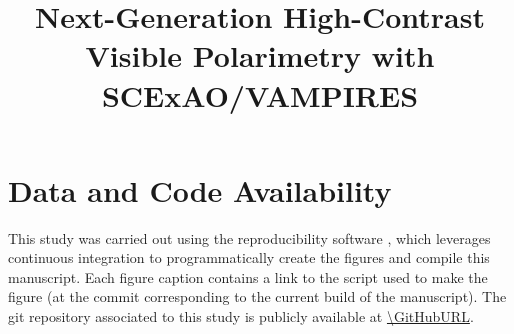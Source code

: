 \documentclass[twocolumn]{aastex631}
\begin{document}
\title{Next-Generation High-Contrast Visible Polarimetry with SCExAO/VAMPIRES}

\begin{abstract}
    
\end{abstract}














\software{}



\appendix



\section{Data and Code Availability}
This study was carried out using the reproducibility software \href{https://github.com/showyourwork/showyourwork}{\showyourwork} \citep{luger_mapping_2021}, which leverages continuous integration to programmatically create the figures and compile this manuscript. Each figure caption contains a link to the script used to make the figure (at the commit corresponding to the current build of the manuscript). The git repository associated to this study is publicly available at \url{\GitHubURL}.
\end{document}
